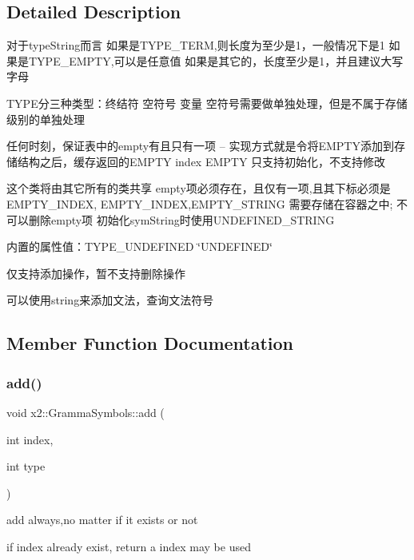 \subsection{Detailed Description}
对于type\+String而言 如果是\+T\+Y\+P\+E\+\_\+\+T\+E\+RM,则长度为至少是1，一般情况下是1 如果是\+T\+Y\+P\+E\+\_\+\+E\+M\+P\+TY,可以是任意值 如果是其它的，长度至少是1，并且建议大写字母

T\+Y\+P\+E分三种类型：终结符 空符号 变量 空符号需要做单独处理，但是不属于存储级别的单独处理

任何时刻，保证表中的empty有且只有一项 -- 实现方式就是令将\+E\+M\+P\+T\+Y添加到存储结构之后，缓存返回的\+E\+M\+P\+TY index E\+M\+P\+TY 只支持初始化，不支持修改

这个类将由其它所有的类共享 empty项必须存在，且仅有一项,且其下标必须是\+E\+M\+P\+T\+Y\+\_\+\+I\+N\+D\+EX, E\+M\+P\+T\+Y\+\_\+\+I\+N\+D\+EX,E\+M\+P\+T\+Y\+\_\+\+S\+T\+R\+I\+NG 需要存储在容器之中; 不可以删除empty项 初始化sym\+String时使用\+U\+N\+D\+E\+F\+I\+N\+E\+D\+\_\+\+S\+T\+R\+I\+NG

内置的属性值：\+T\+Y\+P\+E\+\_\+\+U\+N\+D\+E\+F\+I\+N\+ED \char`\"{}\+U\+N\+D\+E\+F\+I\+N\+E\+D\char`\"{}

仅支持添加操作，暂不支持删除操作

可以使用string来添加文法，查询文法符号 

\subsection{Member Function Documentation}
\mbox{\label{classx2_1_1_gramma_symbols_a5fb0d8e67e6eb5e0b3d36220aa562f1b}} 
\subsubsection{\texorpdfstring{add()}{add()}}
{\footnotesize\ttfamily void x2\+::\+Gramma\+Symbols\+::add (\begin{DoxyParamCaption}\item[{int}]{index,  }\item[{int}]{type }\end{DoxyParamCaption})\hspace{0.3cm}{\ttfamily [inline]}}

add always,no matter if it exists or not

if index already exist, return a index may be used \mbox{\label{classx2_1_1_gramma_symbols_ac7cb85affa4c6c9a6176ace01d6ed4b6}} 
